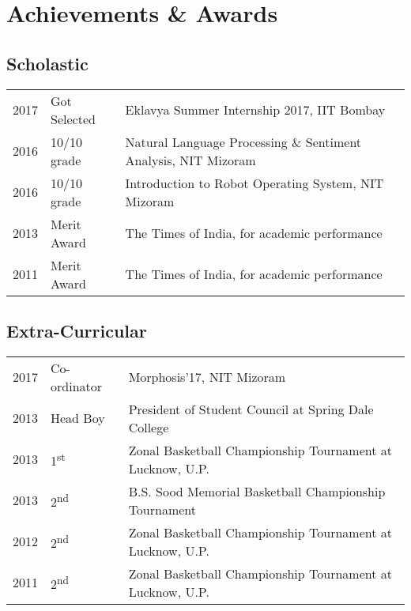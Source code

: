 
\section{Achievements \& Awards} 
\subsection{Scholastic}
\begin{tabular}{rll}
2017         & Got Selected  & Eklavya Summer Internship 2017, IIT Bombay \\
2016	     & 10/10 grade  & Natural Language Processing \& Sentiment Analysis, NIT Mizoram\\
2016	     & 10/10 grade  & Introduction to Robot Operating System, NIT Mizoram\\
2013         & Merit Award  & The Times of India, for academic performance \\
2011         & Merit Award  & The Times of India, for academic performance \\
\end{tabular}
\sectionsep

\subsection{Extra-Curricular}
\begin{tabular}{rll}
2017         & Co-ordinator  & Morphosis'17, NIT Mizoram \\
2013         & Head Boy  & President of Student Council at Spring Dale College \\
2013         & 1\textsuperscript{st}  & Zonal Basketball Championship Tournament at Lucknow, U.P. \\
2013         & 2\textsuperscript{nd}  & B.S. Sood Memorial Basketball Championship Tournament \\
2012         & 2\textsuperscript{nd}  & Zonal Basketball Championship Tournament at Lucknow, U.P. \\
2011         & 2\textsuperscript{nd}  & Zonal Basketball Championship Tournament at Lucknow, U.P. \\
\end{tabular}
\sectionsep